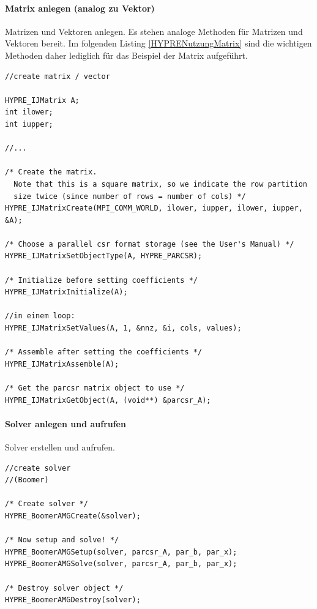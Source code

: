 \documentclass[a4paper,10pt]{article}
\numberwithin{figure}{section}
\numberwithin{table}{section}
\begin{document}
\paragraph{Matrix anlegen (analog zu Vektor)}

Matrizen und Vektoren anlegen.
Es stehen analoge Methoden für Matrizen und Vektoren bereit.
Im folgenden Listing \ref{HYPRENutzungMatrix} sind die wichtigen Methoden daher lediglich für das Beispiel der Matrix aufgeführt.

\begin{lstlisting}[frame=single,caption=HYPRE Nutzung: Matrix anlegen (analog dazu Vektor), label=HYPRENutzungMatrix, breaklines=true]
//create matrix / vector

HYPRE_IJMatrix A;
int ilower;
int iupper;

//...

/* Create the matrix.
  Note that this is a square matrix, so we indicate the row partition
  size twice (since number of rows = number of cols) */
HYPRE_IJMatrixCreate(MPI_COMM_WORLD, ilower, iupper, ilower, iupper, &A);

/* Choose a parallel csr format storage (see the User's Manual) */
HYPRE_IJMatrixSetObjectType(A, HYPRE_PARCSR);

/* Initialize before setting coefficients */
HYPRE_IJMatrixInitialize(A);

//in einem loop:
HYPRE_IJMatrixSetValues(A, 1, &nnz, &i, cols, values);

/* Assemble after setting the coefficients */
HYPRE_IJMatrixAssemble(A);

/* Get the parcsr matrix object to use */
HYPRE_IJMatrixGetObject(A, (void**) &parcsr_A);

\end{lstlisting}

\paragraph{Solver anlegen und aufrufen}

Solver erstellen und aufrufen.

\begin{lstlisting}[frame=single,caption=HYPRE Nutzung: Solver anlegen und aufrufen, breaklines=true]
//create solver
//(Boomer)

/* Create solver */
HYPRE_BoomerAMGCreate(&solver);

/* Now setup and solve! */
HYPRE_BoomerAMGSetup(solver, parcsr_A, par_b, par_x);
HYPRE_BoomerAMGSolve(solver, parcsr_A, par_b, par_x);

/* Destroy solver object */
HYPRE_BoomerAMGDestroy(solver);

\end{lstlisting}
\end{document}
